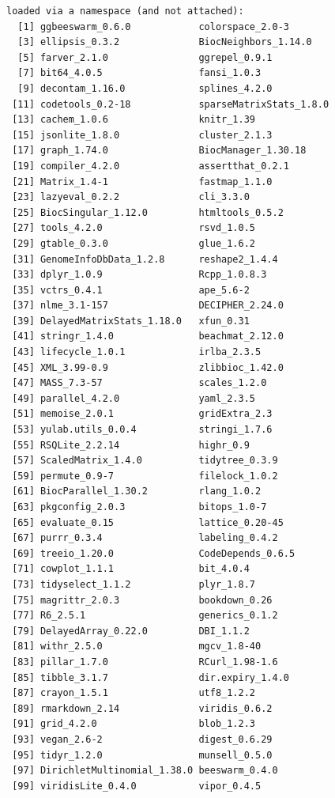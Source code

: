 \documentclass[
]{book}
\begin{document}
\begin{verbatim}
loaded via a namespace (and not attached):
  [1] ggbeeswarm_0.6.0            colorspace_2.0-3           
  [3] ellipsis_0.3.2              BiocNeighbors_1.14.0       
  [5] farver_2.1.0                ggrepel_0.9.1              
  [7] bit64_4.0.5                 fansi_1.0.3                
  [9] decontam_1.16.0             splines_4.2.0              
 [11] codetools_0.2-18            sparseMatrixStats_1.8.0    
 [13] cachem_1.0.6                knitr_1.39                 
 [15] jsonlite_1.8.0              cluster_2.1.3              
 [17] graph_1.74.0                BiocManager_1.30.18        
 [19] compiler_4.2.0              assertthat_0.2.1           
 [21] Matrix_1.4-1                fastmap_1.1.0              
 [23] lazyeval_0.2.2              cli_3.3.0                  
 [25] BiocSingular_1.12.0         htmltools_0.5.2            
 [27] tools_4.2.0                 rsvd_1.0.5                 
 [29] gtable_0.3.0                glue_1.6.2                 
 [31] GenomeInfoDbData_1.2.8      reshape2_1.4.4             
 [33] dplyr_1.0.9                 Rcpp_1.0.8.3               
 [35] vctrs_0.4.1                 ape_5.6-2                  
 [37] nlme_3.1-157                DECIPHER_2.24.0            
 [39] DelayedMatrixStats_1.18.0   xfun_0.31                  
 [41] stringr_1.4.0               beachmat_2.12.0            
 [43] lifecycle_1.0.1             irlba_2.3.5                
 [45] XML_3.99-0.9                zlibbioc_1.42.0            
 [47] MASS_7.3-57                 scales_1.2.0               
 [49] parallel_4.2.0              yaml_2.3.5                 
 [51] memoise_2.0.1               gridExtra_2.3              
 [53] yulab.utils_0.0.4           stringi_1.7.6              
 [55] RSQLite_2.2.14              highr_0.9                  
 [57] ScaledMatrix_1.4.0          tidytree_0.3.9             
 [59] permute_0.9-7               filelock_1.0.2             
 [61] BiocParallel_1.30.2         rlang_1.0.2                
 [63] pkgconfig_2.0.3             bitops_1.0-7               
 [65] evaluate_0.15               lattice_0.20-45            
 [67] purrr_0.3.4                 labeling_0.4.2             
 [69] treeio_1.20.0               CodeDepends_0.6.5          
 [71] cowplot_1.1.1               bit_4.0.4                  
 [73] tidyselect_1.1.2            plyr_1.8.7                 
 [75] magrittr_2.0.3              bookdown_0.26              
 [77] R6_2.5.1                    generics_0.1.2             
 [79] DelayedArray_0.22.0         DBI_1.1.2                  
 [81] withr_2.5.0                 mgcv_1.8-40                
 [83] pillar_1.7.0                RCurl_1.98-1.6             
 [85] tibble_3.1.7                dir.expiry_1.4.0           
 [87] crayon_1.5.1                utf8_1.2.2                 
 [89] rmarkdown_2.14              viridis_0.6.2              
 [91] grid_4.2.0                  blob_1.2.3                 
 [93] vegan_2.6-2                 digest_0.6.29              
 [95] tidyr_1.2.0                 munsell_0.5.0              
 [97] DirichletMultinomial_1.38.0 beeswarm_0.4.0             
 [99] viridisLite_0.4.0           vipor_0.4.5                
\end{verbatim}
\end{document}
